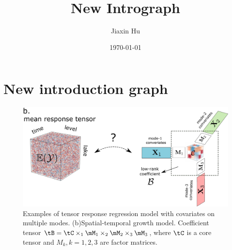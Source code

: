 \documentclass[11pt]{article}
\title{New Intrograph}
\date{\today}
\author{%
Jiaxin Hu
}
\theoremstyle{plain}
\theoremstyle{definition}
\begin{document}

\maketitle


\section{New introduction graph}


\begin{figure}[ht]
\centering
\includegraphics[width=15cm]{newintrofigure.pdf}
\caption{Examples of tensor response regression model with covariates on multiple modes. (b)Spatial-temporal growth model. Coefficient tensor $\tB = \tC \times_1 \mM_1 \times_2 \mM_2 \times_3 \mM_3$, where $\tC$ is a core tensor and $M_k,k = 1,2,3$ are factor matrices. }
\end{figure}
\end{document}
